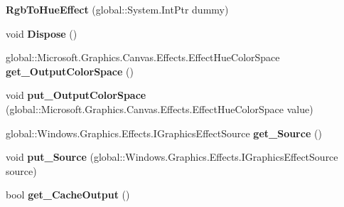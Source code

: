 \begin{DoxyCompactItemize}
{\bfseries Rgb\+To\+Hue\+Effect} (global\+::\+System.\+Int\+Ptr dummy)
\item 
\mbox{\label{class_microsoft_1_1_graphics_1_1_canvas_1_1_effects_1_1_rgb_to_hue_effect_a1407f111a18559e8d864df81ceba280e}} 
void {\bfseries Dispose} ()
\item 
\mbox{\label{class_microsoft_1_1_graphics_1_1_canvas_1_1_effects_1_1_rgb_to_hue_effect_a40eb46a90aa97b3103b90cacbb167e8f}} 
global\+::\+Microsoft.\+Graphics.\+Canvas.\+Effects.\+Effect\+Hue\+Color\+Space {\bfseries get\+\_\+\+Output\+Color\+Space} ()
\item 
\mbox{\label{class_microsoft_1_1_graphics_1_1_canvas_1_1_effects_1_1_rgb_to_hue_effect_a7b46dafa8195822d71d060fa1d29d6cb}} 
void {\bfseries put\+\_\+\+Output\+Color\+Space} (global\+::\+Microsoft.\+Graphics.\+Canvas.\+Effects.\+Effect\+Hue\+Color\+Space value)
\item 
\mbox{\label{class_microsoft_1_1_graphics_1_1_canvas_1_1_effects_1_1_rgb_to_hue_effect_ac010096a9957ca0571bf12f3b4a45b10}} 
global\+::\+Windows.\+Graphics.\+Effects.\+I\+Graphics\+Effect\+Source {\bfseries get\+\_\+\+Source} ()
\item 
\mbox{\label{class_microsoft_1_1_graphics_1_1_canvas_1_1_effects_1_1_rgb_to_hue_effect_aff4c6b2331de6d5065bf56e89ef006b7}} 
void {\bfseries put\+\_\+\+Source} (global\+::\+Windows.\+Graphics.\+Effects.\+I\+Graphics\+Effect\+Source source)
\item 
\mbox{\label{class_microsoft_1_1_graphics_1_1_canvas_1_1_effects_1_1_rgb_to_hue_effect_ad49ad15514b7a28d8c0dba64ffd88feb}} 
bool {\bfseries get\+\_\+\+Cache\+Output} ()
\item 
\mbox{\label{class_microsoft_1_1_graphics_1_1_canvas_1_1_effects_1_1_rgb_to_hue_effect_aadf5e9519480fd7bb5fba6785b971253}} 

\end{DoxyCompactItemize}
